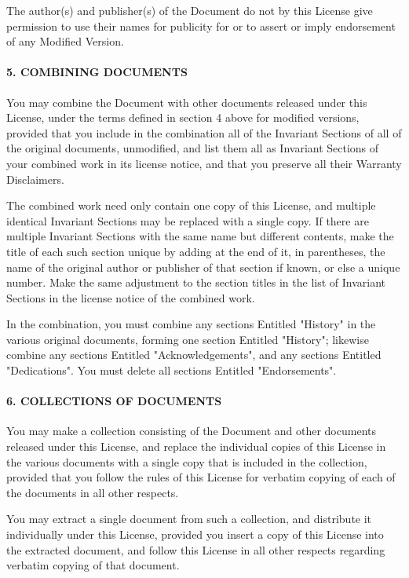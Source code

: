 The author(s) and publisher(s) of the Document do not by this License
give permission to use their names for publicity for or to assert or
imply endorsement of any Modified Version.

\hypertarget{5-combining-documents}{%
\paragraph{5. COMBINING DOCUMENTS}\label{5-combining-documents}}

You may combine the Document with other documents released under this
License, under the terms defined in section 4 above for modified
versions, provided that you include in the combination all of the
Invariant Sections of all of the original documents, unmodified, and
list them all as Invariant Sections of your combined work in its license
notice, and that you preserve all their Warranty Disclaimers.

The combined work need only contain one copy of this License, and
multiple identical Invariant Sections may be replaced with a single
copy. If there are multiple Invariant Sections with the same name but
different contents, make the title of each such section unique by adding
at the end of it, in parentheses, the name of the original author or
publisher of that section if known, or else a unique number. Make the
same adjustment to the section titles in the list of Invariant Sections
in the license notice of the combined work.

In the combination, you must combine any sections Entitled "History" in
the various original documents, forming one section Entitled "History";
likewise combine any sections Entitled "Acknowledgements", and any
sections Entitled "Dedications". You must delete all sections Entitled
"Endorsements".

\hypertarget{6-collections-of-documents}{%
\paragraph{6. COLLECTIONS OF
DOCUMENTS}\label{6-collections-of-documents}}

You may make a collection consisting of the Document and other documents
released under this License, and replace the individual copies of this
License in the various documents with a single copy that is included in
the collection, provided that you follow the rules of this License for
verbatim copying of each of the documents in all other respects.

You may extract a single document from such a collection, and distribute
it individually under this License, provided you insert a copy of this
License into the extracted document, and follow this License in all
other respects regarding verbatim copying of that document.

